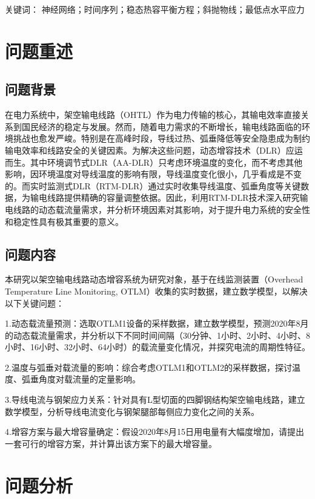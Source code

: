 \documentclass[a4paper,12.045pt]{ctexart}
\begin{document}
	\par\noindent
	\heiti 关键词：
	\songti{}神经网络；时间序列；稳态热容平衡方程；斜抛物线；最低点水平应力
	\pagebreak
	\section{问题重述}  
	\subsection{问题背景}
	在电力系统中，架空输电线路（OHTL）作为电力传输的核心，其输电效率直接关系到国民经济的稳定与发展。然而，随着电力需求的不断增长，输电线路面临的环境挑战也愈发严峻。特别是在高峰时段，导线过热、弧垂降低等安全隐患成为制约输电效率和线路安全的关键因素。为解决这些问题，动态增容技术（DLR）应运而生。其中环境调节式DLR（AA-DLR）只考虑环境温度的变化，而不考虑其他影响，因环境温度对导线温度的影响有限，导线温度变化很小，几乎看成是不变的。而实时监测式DLR（RTM-DLR）通过实时收集导线温度、弧垂角度等关键数据，为输电线路提供精确的容量调整依据。因此，利用RTM-DLR技术深入研究输电线路的动态载流量需求，并分析环境因素对其影响，对于提升电力系统的安全性和稳定性具有极其重要的意义。
	
	\subsection{问题内容}
	本研究以架空输电线路动态增容系统为研究对象，基于在线监测装置（Overhead Temperature Line Monitoring, OTLM）收集的实时数据，建立数学模型，以解决以下关键问题：
	\par
	1.动态载流量预测：选取OTLM1设备的采样数据，建立数学模型，预测2020年8月的动态载流量需求，并分析以下不同时间间隔（30分钟、1小时、2小时、4小时、8小时、16小时、32小时、64小时）的载流量变化情况，并探究电流的周期性特征。
	\par   
	2.温度与弧垂对载流量的影响：综合考虑OTLM1和OTLM2的采样数据，探讨温度、弧垂角度对载流量的定量影响。
	\par 
	3.导线电流与钢架应力关系：针对具有L型切面的四脚钢结构架空输电线路，建立数学模型，分析导线电流变化与钢架腿部每侧应力变化之间的关系。
	\par
	4.增容方案与最大增容量确定：假设2020年8月15日用电量有大幅度增加，请提出一套可行的增容方案，并计算出该方案下的最大增容量。
	\section{问题分析} 
\end{document}
